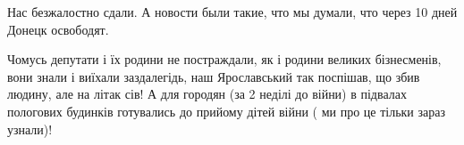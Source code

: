  
 
 
 
 

\qqSecCmt


Нас безжалостно сдали. А новости были такие, что мы думали, что через 10 дней Донецк освободят.


Чомусь депутати і їх родини не постраждали, як і родини великих бізнесменів,
вони знали і виїхали заздалегідь, наш Ярославський так поспішав, що збив
людину, але на літак сів! А для городян (за 2 неділі до війни) в підвалах
пологових будинків готувались до прийому дітей війни ( ми про це тільки зараз
узнали)!

